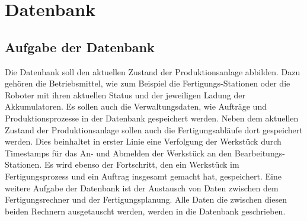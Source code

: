 \chapter{Datenbank}\label{kap:Datenbank}
\section{Aufgabe der Datenbank}\label{kap:ZielDerDatenbank}
Die Datenbank soll den aktuellen Zustand der Produktionsanlage abbilden. Dazu gehören die Betriebsmittel, wie zum Beispiel die Fertigungs-Stationen oder die Roboter mit ihren aktuellen Status und der jeweiligen Ladung der Akkumulatoren. Es sollen auch die Verwaltungsdaten, wie Aufträge und Produktionsprozesse in der Datenbank gespeichert werden. Neben dem aktuellen Zustand der Produktionsanlage sollen auch die Fertigungsabläufe dort gespeichert werden. Dies beinhaltet in erster Linie eine Verfolgung der Werkstück durch Timestamps für das An- und Abmelden der Werkstück an den Bearbeitungs-Stationen. Es wird ebenso der Fortschritt, den ein Werkstück im Fertigungsprozess und ein Auftrag insgesamt gemacht hat, gespeichert. Eine weitere Aufgabe der Datenbank ist der Austausch von Daten zwischen dem Fertigungsrechner und der Fertigungsplanung. Alle Daten die zwischen diesen beiden Rechnern ausgetauscht werden, werden in die Datenbank geschrieben.
 
